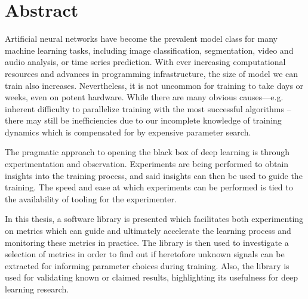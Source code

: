 \chapter*{Abstract}

Artificial neural networks have become the prevalent model class for many
machine learning tasks, including image classification, segmentation, video and
audio analysis, or time series prediction. With ever increasing computational
resources and advances in programming infrastructure, the size of model we can
train also increases. Nevertheless, it is not uncommon for training to take days
or weeks, even on potent hardware. While there are many obvious causes---e.g.
inherent difficulty to parallelize training with the most successful algorithms
-- there may still be inefficiencies due to our incomplete knowledge of training
dynamics which is compensated for by expensive parameter search.

The pragmatic approach to opening the black box of deep learning is
through experimentation and observation. Experiments are being performed to
obtain insights into the training process, and said insights can then be used to
guide the training.  The speed and ease at which experiments can be performed is
tied to the availability of tooling for the experimenter.

In this thesis, a software library is presented which facilitates both
experimenting on metrics which can guide and ultimately accelerate the learning
process and monitoring these metrics in practice. The library is then used to
investigate a selection of metrics in order to find out if heretofore unknown
signals can be extracted for informing parameter choices during training. Also,
the library is used for validating known or claimed results, highlighting its
usefulness for deep learning research.
